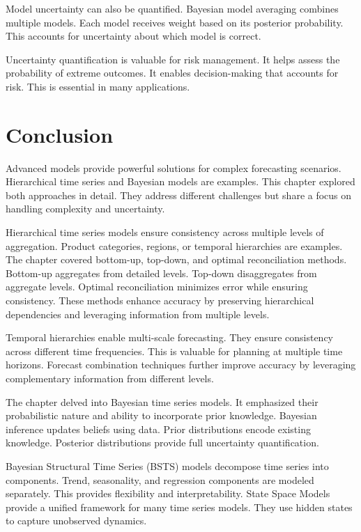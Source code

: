 Model uncertainty can also be quantified. Bayesian model averaging combines multiple models. Each model receives weight based on its posterior probability. This accounts for uncertainty about which model is correct.

Uncertainty quantification is valuable for risk management. It helps assess the probability of extreme outcomes. It enables decision-making that accounts for risk. This is essential in many applications.



\section{Conclusion}

Advanced models provide powerful solutions for complex forecasting scenarios. Hierarchical time series and Bayesian models are examples. This chapter explored both approaches in detail. They address different challenges but share a focus on handling complexity and uncertainty.

Hierarchical time series models ensure consistency across multiple levels of aggregation. Product categories, regions, or temporal hierarchies are examples. The chapter covered bottom-up, top-down, and optimal reconciliation methods. Bottom-up aggregates from detailed levels. Top-down disaggregates from aggregate levels. Optimal reconciliation minimizes error while ensuring consistency. These methods enhance accuracy by preserving hierarchical dependencies and leveraging information from multiple levels.

Temporal hierarchies enable multi-scale forecasting. They ensure consistency across different time frequencies. This is valuable for planning at multiple time horizons. Forecast combination techniques further improve accuracy by leveraging complementary information from different levels.

The chapter delved into Bayesian time series models. It emphasized their probabilistic nature and ability to incorporate prior knowledge. Bayesian inference updates beliefs using data. Prior distributions encode existing knowledge. Posterior distributions provide full uncertainty quantification.

Bayesian Structural Time Series (BSTS) models decompose time series into components. Trend, seasonality, and regression components are modeled separately. This provides flexibility and interpretability. State Space Models provide a unified framework for many time series models. They use hidden states to capture unobserved dynamics.


